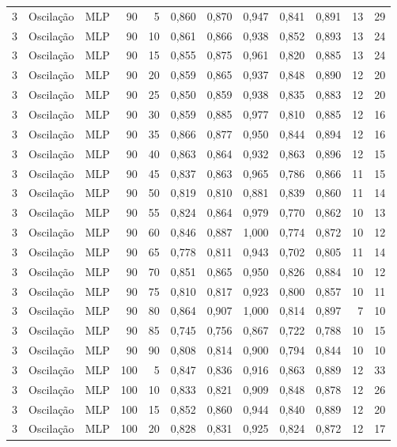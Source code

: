 \begin{longtable}{@{}rllrrrrrrrrr@{}}
3 & Oscilação & MLP & 90 & 5 & 0,860 & 0,870 & 0,947 & 0,841 & 0,891 & 13 & 29 \\
3 & Oscilação & MLP & 90 & 10 & 0,861 & 0,866 & 0,938 & 0,852 & 0,893 & 13 & 24 \\
3 & Oscilação & MLP & 90 & 15 & 0,855 & 0,875 & 0,961 & 0,820 & 0,885 & 13 & 24 \\
3 & Oscilação & MLP & 90 & 20 & 0,859 & 0,865 & 0,937 & 0,848 & 0,890 & 12 & 20 \\
3 & Oscilação & MLP & 90 & 25 & 0,850 & 0,859 & 0,938 & 0,835 & 0,883 & 12 & 20 \\
3 & Oscilação & MLP & 90 & 30 & 0,859 & 0,885 & 0,977 & 0,810 & 0,885 & 12 & 16 \\
3 & Oscilação & MLP & 90 & 35 & 0,866 & 0,877 & 0,950 & 0,844 & 0,894 & 12 & 16 \\
3 & Oscilação & MLP & 90 & 40 & 0,863 & 0,864 & 0,932 & 0,863 & 0,896 & 12 & 15 \\
3 & Oscilação & MLP & 90 & 45 & 0,837 & 0,863 & 0,965 & 0,786 & 0,866 & 11 & 15 \\
3 & Oscilação & MLP & 90 & 50 & 0,819 & 0,810 & 0,881 & 0,839 & 0,860 & 11 & 14 \\
3 & Oscilação & MLP & 90 & 55 & 0,824 & 0,864 & 0,979 & 0,770 & 0,862 & 10 & 13 \\
3 & Oscilação & MLP & 90 & 60 & 0,846 & 0,887 & 1,000 & 0,774 & 0,872 & 10 & 12 \\
3 & Oscilação & MLP & 90 & 65 & 0,778 & 0,811 & 0,943 & 0,702 & 0,805 & 11 & 14 \\
3 & Oscilação & MLP & 90 & 70 & 0,851 & 0,865 & 0,950 & 0,826 & 0,884 & 10 & 12 \\
3 & Oscilação & MLP & 90 & 75 & 0,810 & 0,817 & 0,923 & 0,800 & 0,857 & 10 & 11 \\
3 & Oscilação & MLP & 90 & 80 & 0,864 & 0,907 & 1,000 & 0,814 & 0,897 & 7 & 10 \\
3 & Oscilação & MLP & 90 & 85 & 0,745 & 0,756 & 0,867 & 0,722 & 0,788 & 10 & 15 \\
3 & Oscilação & MLP & 90 & 90 & 0,808 & 0,814 & 0,900 & 0,794 & 0,844 & 10 & 10 \\
3 & Oscilação & MLP & 100 & 5 & 0,847 & 0,836 & 0,916 & 0,863 & 0,889 & 12 & 33 \\
3 & Oscilação & MLP & 100 & 10 & 0,833 & 0,821 & 0,909 & 0,848 & 0,878 & 12 & 26 \\
3 & Oscilação & MLP & 100 & 15 & 0,852 & 0,860 & 0,944 & 0,840 & 0,889 & 12 & 20 \\
3 & Oscilação & MLP & 100 & 20 & 0,828 & 0,831 & 0,925 & 0,824 & 0,872 & 12 & 17 \\

\end{longtable}
